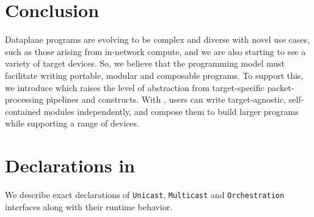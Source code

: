 \documentclass[letterpaper,twocolumn,10pt]{article}
\begin{document}
\section{Conclusion}
Dataplane programs are evolving to be complex and diverse with novel
use cases, such as those arising from in-network compute, and we are
also starting to see a variety of target devices. So, we believe that
the programming model must facilitate writing portable, modular and
composable programs. To support this, we introduce \ulang which raises
the level of abstraction from target-specific packet-processing
pipelines and constructs. With \ulang, users can write
target-agnostic, self-contained modules independently, and compose
them to build larger programs while supporting a range of devices.



\clearpage




\appendix
\section{Declarations in \uarch}
\label{appendix:section:micro-switch-architecture}
We describe exact declarations of \texttt{Unicast}, 
\texttt{Multicast} and \texttt{Orchestration} interfaces along with 
their runtime behavior. 
\end{document}
